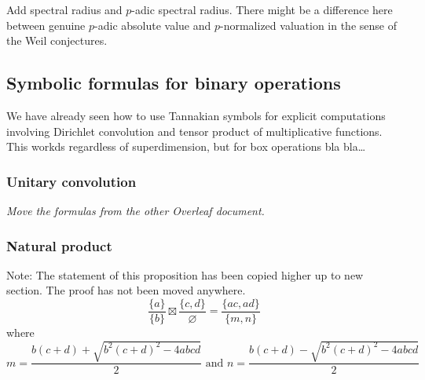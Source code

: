 \documentclass[a4paper]{article}
\begin{document}

Add spectral radius and $p$-adic spectral radius. There might be a difference here between genuine $p$-adic absolute value and $p$-normalized valuation in the sense of the Weil conjectures.

\subsection{Symbolic formulas for binary operations}

We have already seen how to use Tannakian symbols for explicit computations involving Dirichlet convolution and tensor product of multiplicative functions. This workds regardless of superdimension, but for box operations bla bla\ldots


\subsubsection{Unitary convolution}


\emph{Move the formulas from the other Overleaf document.}


\subsubsection{Natural product}



\begin{proposition}
Note: The statement of this proposition has been copied higher up to new section. The proof has not been moved anywhere.
$$\frac{\{a\}}{\{b\}} \boxtimes \frac{\{c,d\}}{\varnothing} = \frac{\{ac,ad\}}{\{m, n\}}$$
where 
$$m = \frac{b(c+d) + \sqrt{b^2 (c+d)^2 - 4abcd}}{2} \text{\ and\ } n = \frac{b(c+d) - \sqrt{b^2 (c+d)^2 - 4abcd}}{2}$$
\end{proposition}
\end{document}
